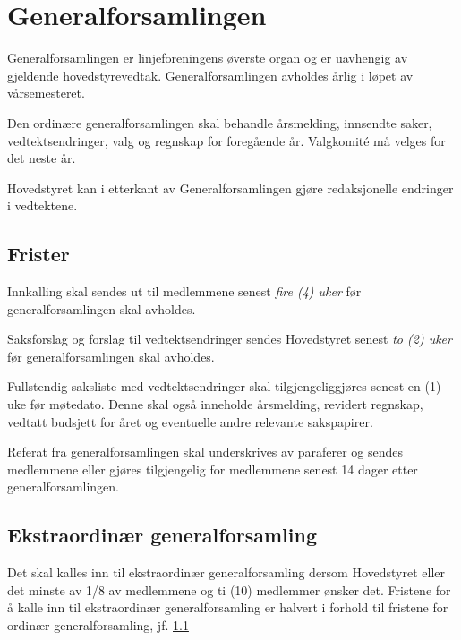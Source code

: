 \chapter{Generalforsamlingen}

Generalforsamlingen er linjeforeningens øverste organ og er uavhengig av gjeldende hovedstyrevedtak. Generalforsamlingen avholdes årlig i løpet av vårsemesteret.\newline

Den ordinære generalforsamlingen skal behandle årsmelding, innsendte saker, vedtektsendringer, valg og regnskap for foregående år. Valgkomité må velges for det neste år.

Hovedstyret kan i etterkant av Generalforsamlingen gjøre redaksjonelle endringer i vedtektene.  

\section{Frister}
\label{sec:frister}
\begin{liste}
	\item Innkalling skal sendes ut til medlemmene senest \emph{fire (4) uker}  før \mbox{generalforsamlingen} skal avholdes.
	\item Saksforslag og forslag til vedtektsendringer sendes Hovedstyret senest \emph{to (2) uker} før generalforsamlingen skal avholdes.
	\item Fullstendig saksliste med vedtektsendringer skal tilgjengeliggjøres senest en (1) uke før møtedato. Denne skal også inneholde årsmelding, revidert regnskap, vedtatt budsjett for året og eventuelle andre relevante sakspapirer.
	\item Referat fra generalforsamlingen skal underskrives av paraferer og sendes \linebreak medlemmene eller gjøres tilgjengelig for medlemmene senest 14 dager etter generalforsamlingen.
\end{liste}


\section{Ekstraordinær generalforsamling}
\vspace{23pt}
Det skal kalles inn til ekstraordinær generalforsamling dersom Hovedstyret eller det minste av 1/8 av medlemmene og ti (10) medlemmer ønsker det. Fristene for å kalle inn til ekstraordinær generalforsamling er halvert i forhold til fristene for ordinær generalforsamling, jf. \ref{sec:frister}\newline

